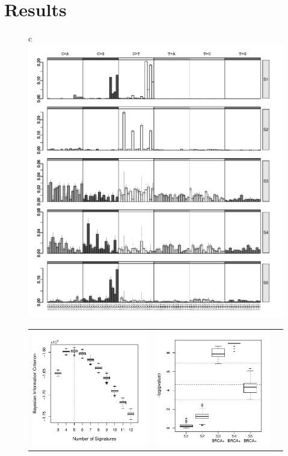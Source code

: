 \documentclass{bioinfo}
\begin{document}
\section{Results}
\begin{figure}[t!]
 \centering
  \begin{tabular}{c}
     \includegraphics[width=13cm]{figs/Signatures_5_com_Opp_bw}
    \\
    \begin{tabular}{ccc}
     \includegraphics[width=5.5cm]{figs/BICs_21bc_with_Opportunity_5_3to12}
     &
     \includegraphics[width=5.5cm]{figs/Diffexp_boxplot_21bc_com_Opp_bw3}

\end{tabular}
\end{tabular}
\end{figure}
\end{document}
